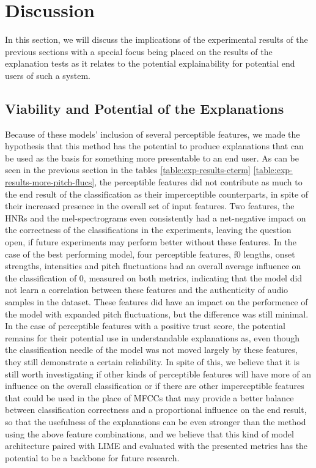 \documentclass{article}
\begin{document}
	\section{Discussion}
	\label{sec:discussion}
	In this section, we will discuss the implications of the experimental results of the previous
	sections with a special focus being placed on the results of the explanation tests as it
	relates to the potential explainability for potential end users of such a system.
		\subsection{Viability and Potential of the Explanations}
		Because of these models' inclusion of several perceptible features, we made the hypothesis
		that this method has the potential to produce explanations that can be used as the basis
		for something more presentable to an end user. As can be seen in the previous section in
		the tables \ref{table:exp-results-cterm} \ref{table:exp-results-more-pitch-flucs}, the
		perceptible features did not contribute as much to the end result of the classification as
		their imperceptible counterparts, in spite of their increased presence in the overall set
		of input features. Two features, the HNRs and the mel-spectrograms even consistently had a
		net-negative impact on the correctness of the classifications in the experiments, leaving
		the question open, if future experiments may perform better without these features. In the
		case of the best performing model, four perceptible features, f0 lengths, onset strengths,
		intensities and pitch fluctuations had an overall average influence on the classification
		of 0, measured on both metrics, indicating that the model did not learn a correlation
		between these features and the authenticity of audio samples in the dataset. These features
		did have an impact on the performence of the model with expanded pitch fluctuations, but
		the difference was still minimal. In the case of perceptible features with a positive
		trust score, the potential remains for their potential use in understandable explanations
		as, even though the classification needle of the model was not moved largely by these
		features, they still demonstrate a certain reliability. In spite of this, we believe that
		it is still worth investigating if other kinds of perceptible features will have more of
		an influence on the overall classification or if there are other imperceptible features
		that could be used in the place of MFCCs that may provide a better balance between
		classification correctness and a proportional influence on the end result, so that the
		usefulness of the explanations can be even stronger than the method using the above
		feature combinations, and we believe that this kind of model architecture paired with LIME
		and evaluated with the presented metrics has the potential to be a backbone for future
		research.
\end{document}
